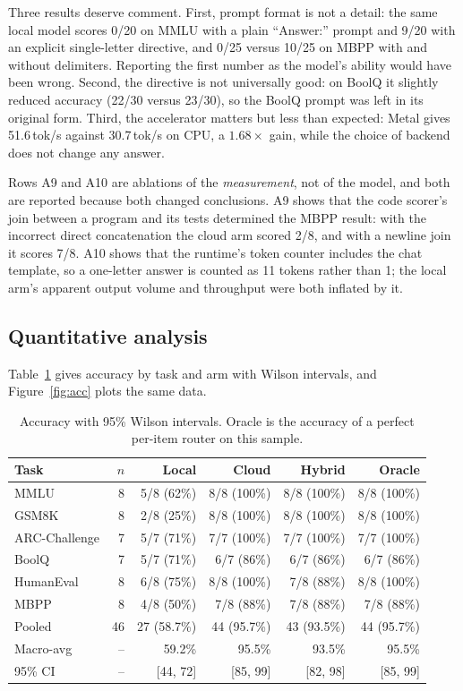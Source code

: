 \documentclass[11pt,a4paper]{article}
\begin{document}
Three results deserve comment. First, prompt format is not a detail: the same
local model scores 0/20 on MMLU with a plain ``Answer:'' prompt and 9/20 with an
explicit single-letter directive, and 0/25 versus 10/25 on MBPP with and without
delimiters. Reporting the first number as the model's ability would have been
wrong. Second, the directive is not universally good: on BoolQ it slightly
reduced accuracy (22/30 versus 23/30), so the BoolQ prompt was left in its
original form. Third, the accelerator matters but less than expected: Metal
gives 51.6\,tok/s against 30.7\,tok/s on CPU, a $1.68\times$ gain, while the
choice of backend does not change any answer.

Rows A9 and A10 are ablations of the \emph{measurement}, not of the model, and
both are reported because both changed conclusions. A9 shows that the code
scorer's join between a program and its tests determined the MBPP result: with
the incorrect direct concatenation the cloud arm scored 2/8, and with a newline
join it scores 7/8. A10 shows that the runtime's token counter includes the chat
template, so a one-letter answer is counted as 11 tokens rather than 1; the
local arm's apparent output volume and throughput were both inflated by it.

\subsection{Quantitative analysis}
\label{sec:quant}
Table~\ref{tab:accuracy} gives accuracy by task and arm with Wilson intervals,
and Figure~\ref{fig:acc} plots the same data.

\begin{table}[!htbp]
\centering
\small
\caption{Accuracy with 95\% Wilson intervals. Oracle is the accuracy of a
perfect per-item router on this sample.}
\label{tab:accuracy}
\begin{tabular}{@{}lrrrrr@{}}
\toprule
Task & $n$ & Local & Cloud & Hybrid & Oracle \\
\midrule
MMLU & 8 & 5/8 (62\%) & 8/8 (100\%) & 8/8 (100\%) & 8/8 (100\%) \\
GSM8K & 8 & 2/8 (25\%) & 8/8 (100\%) & 8/8 (100\%) & 8/8 (100\%) \\
ARC-Challenge & 7 & 5/7 (71\%) & 7/7 (100\%) & 7/7 (100\%) & 7/7 (100\%) \\
BoolQ & 7 & 5/7 (71\%) & 6/7 (86\%) & 6/7 (86\%) & 6/7 (86\%) \\
HumanEval & 8 & 6/8 (75\%) & 8/8 (100\%) & 7/8 (88\%) & 8/8 (100\%) \\
MBPP & 8 & 4/8 (50\%) & 7/8 (88\%) & 7/8 (88\%) & 7/8 (88\%) \\
\midrule
Pooled & 46 & 27 (58.7\%) & 44 (95.7\%) & 43 (93.5\%) & 44 (95.7\%) \\
Macro-avg & -- & 59.2\% & 95.5\% & 93.5\% & 95.5\% \\
95\% CI & -- & [44, 72] & [85, 99] & [82, 98] & [85, 99] \\
\bottomrule
\end{tabular}
\end{table}
\end{document}
